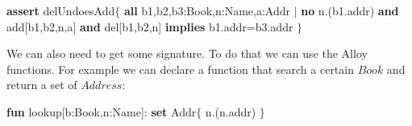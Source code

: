 \documentclass[12pt, a4paper]{report}
\newtheorem[style=M,bodystyle=\normalfont]{theorem}{Theorem}
\newtheorem[style=M,bodystyle=\normalfont]{corollary}{Corollary}
\newtheorem[style=M,bodystyle=\normalfont]{lemma}{Lemma}
\newtheorem[style=M,bodystyle=\normalfont]{definition}{Definition}
\begin{document}
        \begin{algorithmic}[H]
            \State \textbf{assert} delUndoesAdd$\{$
            \State \:\:\:\:\:\:\:\: \textbf{all} b1,b2,b3:Book,n:Name,a:Addr $\mid$
            \State \:\:\:\:\:\:\:\: \textbf{no} n.(b1.addr) \textbf{and} add[b1,b2,n,a] \textbf{and} del[b1,b2,n]
            \State \:\:\:\:\:\:\:\: \textbf{implies} b1.addr=b3.addr
            \State $\}$
        \end{algorithmic} 
        We can also need to get some signature. To do that we can use the Alloy functions. For example we can declare a function that search a certain $Book$ and return a set of $Address$:
        \begin{algorithmic}[H]
            \State \textbf{fun} lookup[b:Book,n:Name]: \textbf{set} Addr$\{$
            \State \:\:\:\:\:\:\:\: n.(n.addr)
            \State $\}$
        \end{algorithmic} 
    
\end{document}
